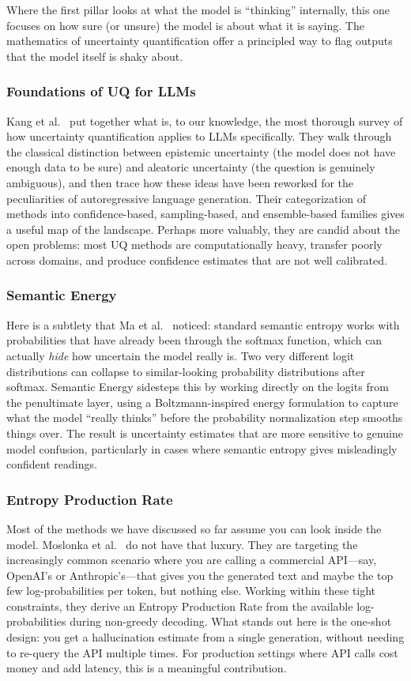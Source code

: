 \documentclass[journal]{IEEEtran}
\begin{document}
Where the first pillar looks at what the model is ``thinking'' internally, this one focuses on how sure (or unsure) the model is about what it is saying. The mathematics of uncertainty quantification offer a principled way to flag outputs that the model itself is shaky about.

\subsubsection{Foundations of UQ for LLMs}
Kang et al.~\cite{uq_survey} put together what is, to our knowledge, the most thorough survey of how uncertainty quantification applies to LLMs specifically. They walk through the classical distinction between epistemic uncertainty (the model does not have enough data to be sure) and aleatoric uncertainty (the question is genuinely ambiguous), and then trace how these ideas have been reworked for the peculiarities of autoregressive language generation. Their categorization of methods into confidence-based, sampling-based, and ensemble-based families gives a useful map of the landscape. Perhaps more valuably, they are candid about the open problems: most UQ methods are computationally heavy, transfer poorly across domains, and produce confidence estimates that are not well calibrated.

\subsubsection{Semantic Energy}
Here is a subtlety that Ma et al.~\cite{semantic_energy} noticed: standard semantic entropy works with probabilities that have already been through the softmax function, which can actually \emph{hide} how uncertain the model really is. Two very different logit distributions can collapse to similar-looking probability distributions after softmax. Semantic Energy sidesteps this by working directly on the logits from the penultimate layer, using a Boltzmann-inspired energy formulation to capture what the model ``really thinks'' before the probability normalization step smooths things over. The result is uncertainty estimates that are more sensitive to genuine model confusion, particularly in cases where semantic entropy gives misleadingly confident readings.

\subsubsection{Entropy Production Rate}
Most of the methods we have discussed so far assume you can look inside the model. Moslonka et al.~\cite{epr} do not have that luxury. They are targeting the increasingly common scenario where you are calling a commercial API---say, OpenAI's or Anthropic's---that gives you the generated text and maybe the top few log-probabilities per token, but nothing else. Working within these tight constraints, they derive an Entropy Production Rate from the available log-probabilities during non-greedy decoding. What stands out here is the one-shot design: you get a hallucination estimate from a single generation, without needing to re-query the API multiple times. For production settings where API calls cost money and add latency, this is a meaningful contribution.
\end{document}
